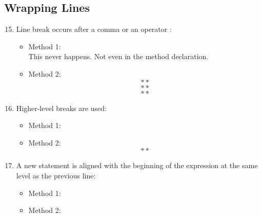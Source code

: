 \subsection{Wrapping Lines}
\begin{enumerate}
	\setcounter{enumi}{14}
	\item Line break occurs after a comma or an operator :
	\begin{itemize}
		\item Method 1: \xmark \\
		This never happens. Not even in the method declaration.
		\item Method 2: \xmark\\
		$$**$$
		$$**$$
		$$**$$
	\end{itemize}
	\item Higher-level breaks are used:
	\begin{itemize}
		\item Method 1: \cmark
		\item Method 2: \xmark\\
		$$**$$
	\end{itemize}
	\item A new statement is aligned with the beginning of the expression at the same level as the previous line:
	\begin{itemize}
		\item Method 1: \cmark
		\item Method 2: \cmark
	\end{itemize}
\end{enumerate}